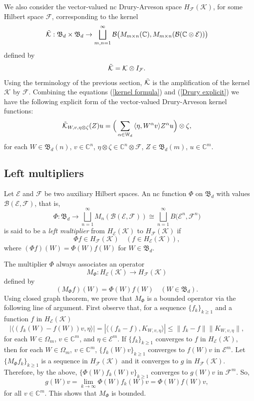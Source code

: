 \documentclass[12pt]{amsart}%
\numberwithin{equation}{section}
\newcommand{\fB}{{\mathfrak{B}}}
\newcommand{\clb}{\mathcal{B}}
\newcommand{\cle}{\mathcal{E}}
\newcommand{\clf}{\mathcal{F}}
\newcommand{\clk}{\mathcal{K}}
\newcommand{\C}{\mathbb{C}}
\newcommand\la{{\langle }}
\newcommand\ra{{\rangle}}
\begin{document}
We also consider the vector-valued nc Drury-Arveson space $H_\clf(\clk)$, for some Hilbert space $\clf$, corresponding to the kernel
\[
\Tilde{\clk}:\fB_d \times \fB_d \to  \bigsqcup_{m, n=1}^\infty \clb \big(M_{m\times n}(\C), M_{m\times n}(\clb(\C \otimes \cle))\big) 
\]
defined by 
\[
\Tilde{\clk}=\clk \otimes I_\clf.
\]
Using the terminology of the previous section, $\Tilde{\clk}$ is the amplification of the kernel $\clk$ by $\clf$. Combining the equations (\ref{kernel formula}) and (\ref{Drury explicit}) we have the following explicit form of the vector-valued Drury-Arveson kernel functions:
\[
\Tilde{\clk}_{W, v,\eta\otimes \zeta}(Z)u=\Big (\sum_{\alpha\in \mathbb{W}_d} \la \eta, W^\alpha v\ra Z^\alpha u \Big )\otimes \zeta,
\]
for each $W\in\fB_d(n)$, $v\in \C^n$, $\eta \otimes \zeta \in \C^n\otimes \clf$, $Z\in\fB_d(m)$, $u\in \C^m$.


\subsection{Left multipliers}
Let $\cle$ and $\clf$ be two auxiliary Hilbert spaces. An nc function 
$\Phi$ on $\fB_d$ with values $\clb(\cle, \clf)$, that is,
\[
\Phi:\fB_d \to \bigsqcup_{n=1}^\infty M_n(\clb(\cle, \clf))\cong\bigsqcup_{n=1}^{\infty} B\big(\cle^n, \clf^n\big)
\]
is said to be a \textit{left multiplier} from $H_\cle(\clk)$ to $H_\clf(\clk)$ if 
\[\Phi f\in H_\clf(\clk)\quad(f\in H_\cle(\clk)),
\]
where $(\Phi f)(W)=\Phi(W) f(W)$ for $W\in \fB_d$. 

The multiplier $\Phi$ always associates an operator
\[M_\Phi :H_\cle(\clk)\to H_\clf(\clk)\]
defined by 
\[
(M_\Phi f)(W)=\Phi(W) f(W) \quad (W\in \fB_d).
\]
Using closed graph theorem, we prove that $M_\Phi$ is a bounded operator via the following line of argument. First observe that, for a sequence $\{f_k\}_{k\geq 1}$ and a function $f$ in $H_\cle(\clk)$
\[
|\langle (f_k(W) - f(W) )v, \eta \rangle|=|\langle (f_k- f ), K_{W, v, \eta} \rangle|\leq \|f_k-f\|\|K_{W, v,\eta}\|,
\]
for each $W\in \Omega_m$, $v\in \C^m$, and $\eta\in \cle^m$. If $\{f_k\}_{k\geq 1}$ converges to $f$ in $H_\cle(\clk)$, then for each $W\in \Omega_m$, $v\in \C^m$, $\{f_k(W)v\}_{k\geq 1}$ converges to $f(W)v$ in  $\cle^m$. Let $\{M_{\Phi}f_k\}_{k\geq 1}$ is a sequence in $H_\clf(\clk)$ and it converges to $g$ in $H_\clf(\clk)$. Therefore, by the above, $\{\Phi(W)f_k(W)v\}_{k\geq 1}$  converges to $g(W)v$  in $\clf^m$. So,
\[
g(W)v =\lim_{k\to \infty} \Phi(W)f_k(W) v = \Phi(W)f(W) v,
\]
for all $v\in \C^m$. This shows that $M_\Phi$ is bounded.
\end{document}
